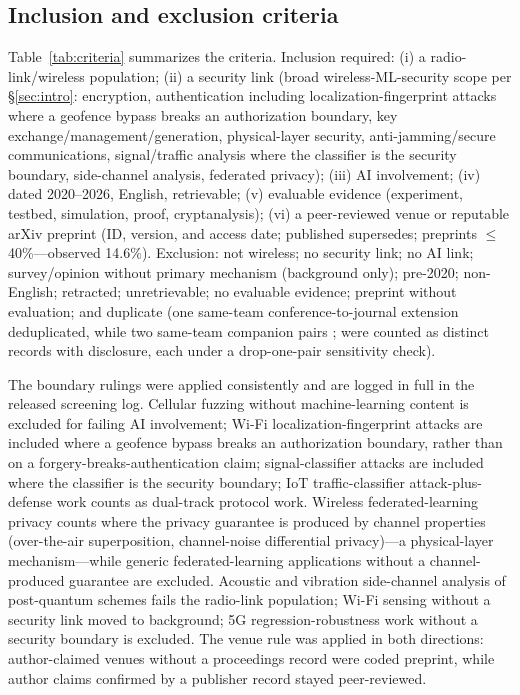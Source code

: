 \documentclass[10.5pt,compsoc,winfonts]{ICN}
\newcommand{\upcite}[1]{\cite{#1}}
\begin{document}
\subsection{Inclusion and exclusion criteria}
Table~\ref{tab:criteria} summarizes the criteria. Inclusion required: (i) a radio-link/wireless population; (ii) a security link (broad wireless-ML-security scope per \S\ref{sec:intro}: encryption, authentication including localization-fingerprint attacks where a geofence bypass breaks an authorization boundary, key exchange/management/generation, physical-layer security, anti-jamming/secure communications, signal/traffic analysis where the classifier is the security boundary, side-channel analysis, federated privacy); (iii) AI involvement; (iv) dated 2020–2026, English, retrievable; (v) evaluable evidence (experiment, testbed, simulation, proof, cryptanalysis); (vi) a peer-reviewed venue or reputable arXiv preprint (ID, version, and access date; published supersedes; preprints $\le$40\%—observed 14.6\%). Exclusion: not wireless; no security link; no AI link; survey/opinion without primary mechanism (background only); pre-2020; non-English; retracted; unretrievable; no evaluable evidence; preprint without evaluation; and duplicate (one same-team conference-to-journal extension deduplicated, while two same-team companion pairs \upcite{D55,T15}; \upcite{D20,T20} were counted as distinct records with disclosure, each under a drop-one-pair sensitivity check).

The boundary rulings were applied consistently and are logged in full in the released screening log. Cellular fuzzing without machine-learning content is excluded for failing AI involvement; Wi-Fi localization-fingerprint attacks are included where a geofence bypass breaks an authorization boundary, rather than on a forgery-breaks-authentication claim; signal-classifier attacks are included where the classifier is the security boundary; IoT traffic-classifier attack-plus-defense work counts as dual-track protocol work. Wireless federated-learning privacy counts where the privacy guarantee is produced by channel properties (over-the-air superposition, channel-noise differential privacy)—a physical-layer mechanism—while generic federated-learning applications without a channel-produced guarantee are excluded. Acoustic and vibration side-channel analysis of post-quantum schemes fails the radio-link population; Wi-Fi sensing without a security link moved to background; 5G regression-robustness work without a security boundary is excluded. The venue rule was applied in both directions: author-claimed venues without a proceedings record were coded preprint, while author claims confirmed by a publisher record stayed peer-reviewed.
\end{document}
